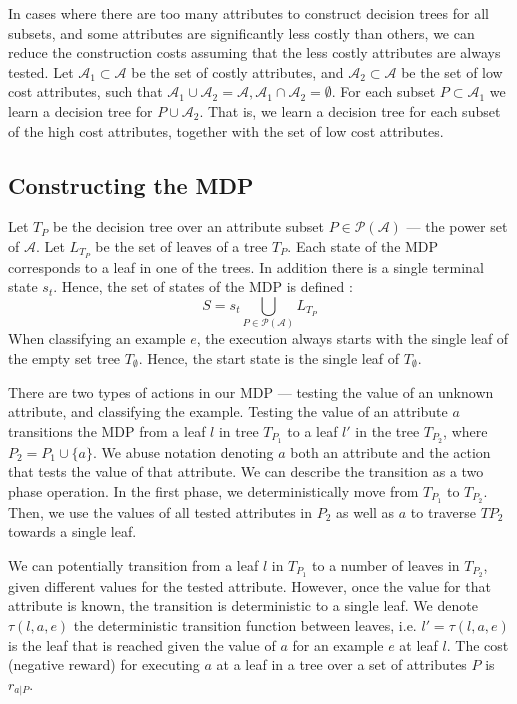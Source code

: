 \documentclass[letterpaper]{article}
\theoremstyle{definition}
\begin{document}
In cases where there are too many attributes to construct decision trees for all subsets, and some attributes are significantly less costly than others, we can reduce the construction costs  assuming that the less costly attributes are always tested. Let $\mathcal{A}_1 \subset \mathcal{A}$ be the set of costly attributes, and $\mathcal{A}_2 \subset \mathcal{A}$ be the set of low cost attributes, such that $\mathcal{A}_1 \cup \mathcal{A}_2 = \mathcal{A}, \mathcal{A}_1 \cap \mathcal{A}_2 = \emptyset$. For each subset $P \subset \mathcal{A}_1$ we learn a decision tree for $P \cup \mathcal{A}_2$.
That is, we learn a decision tree for each subset of the high cost attributes, together with the set of low cost attributes.

\subsection{Constructing the MDP}

Let $T_P$ be the decision tree over an attribute subset $P \in \mathcal{P}(\mathcal{A})$ --- the power set of $\mathcal{A}$. Let $L_{T_P}$ be the set of leaves of a tree $T_P$.
Each state of the MDP corresponds to a leaf in one of the trees. In addition there is a single terminal state $s_t$. Hence, the set of states of the MDP is defined :
\begin{equation}
S=s_t \bigcup_{P \in \mathcal{P}(\mathcal{A})}L_{T_P}
\end{equation}
When classifying an example $e$, the execution always starts with the single leaf of the empty set tree $T_{\emptyset}$. Hence, the start state is the single leaf of $T_{\emptyset}$.

There are two types of actions in our MDP --- testing the value of an unknown attribute, and classifying the example. Testing the value of an attribute $a$ transitions the MDP from a leaf $l$ in tree $T_{P_1}$ to a leaf $l'$ in the tree $T_{P_2}$, where $P_2 = P_1 \cup \{a\}$. We abuse notation  denoting  $a$ both an attribute and the action that tests the value of that attribute. We can describe the transition as a two phase operation. In the first phase, we deterministically move from $T_{P_1}$ to $T_{P_2}$. Then, we use the values of all tested attributes in $P_2$ as well as $a$ to traverse $T{P_2}$ towards a single leaf.

We can potentially transition from a leaf $l$ in $T_{P_1}$ to a number of leaves in $T_{P_2}$, given different values for the tested attribute. However, once the value for that attribute is known, the transition is deterministic to a single leaf. We denote  $\tau(l,a,e)$ the deterministic transition function between leaves, i.e. $l'=\tau(l,a,e)$ is the leaf that is reached given the value of $a$ for an example $e$ at leaf $l$. The cost (negative reward) for executing $a$ at a leaf in a tree over a set of attributes $P$ is $r_{a|P}$.
\end{document}
